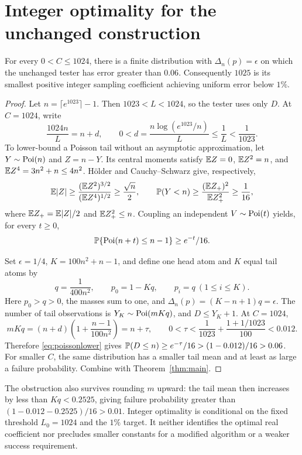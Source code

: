 \section{Integer optimality for the unchanged construction}
\begin{theorem}\label{thm:integer}
For every $0<C\le1024$, there is a finite distribution with
$\Delta_n(p)=\epsilon$ on which the unchanged tester has error greater
than $0.06$. Consequently $1025$ is its smallest positive integer sampling
coefficient achieving uniform error below $1\%$.
\end{theorem}
\begin{proof}
Let $n=\lceil e^{1023}\rceil-1$. Then $1023<L<1024$, so the tester uses
only $D$. At $C=1024$, write
\begin{equation}
 \frac{1024n}{L}=n+d,\qquad
 0<d=\frac{n\log(e^{1023}/n)}{L}\le\frac1L<\frac1{1023}.
 \label{eq:excess}
\end{equation}
To lower-bound a Poisson tail without an asymptotic approximation, let
$Y\sim\operatorname{Poi}(n)$ and $Z=n-Y$. Its central moments satisfy
$\mathbb E Z=0$, $\mathbb E Z^2=n$, and $\mathbb E Z^4=3n^2+n\le4n^2$.
H\"older and Cauchy--Schwarz give, respectively,
\[
 \mathbb E|Z|\ge\frac{(\mathbb E Z^2)^{3/2}}{(\mathbb E Z^4)^{1/2}}\ge\frac{\sqrt n}{2},
 \qquad
 \mathbb P(Y<n)\ge\frac{(\mathbb E Z_+)^2}{\mathbb E Z_+^2}\ge\frac1{16},
\]
where $\mathbb E Z_+=\mathbb E|Z|/2$ and $\mathbb E Z_+^2\le n$. Coupling an independent
$V\sim\operatorname{Poi}(t)$ yields, for every $t\ge0$,
\begin{equation}
 \mathbb P\{\operatorname{Poi}(n+t)\le n-1\}\ge e^{-t}/16.
 \label{eq:poissonlower}
\end{equation}

Set $\epsilon=1/4$, $K=100n^2+n-1$, and define one head atom and $K$
equal tail atoms by
\[
 q=\frac1{400n^2},\qquad p_0=1-Kq,\qquad p_i=q\ (1\le i\le K).
\]
Here $p_0>q>0$, the masses sum to one, and
$\Delta_n(p)=(K-n+1)q=\epsilon$. The number of tail observations is
$Y_K\sim\operatorname{Poi}(mKq)$, and $D\le Y_K+1$. At $C=1024$,
\[
 mKq=(n+d)\left(1+\frac{n-1}{100n^2}\right)=n+\tau,\qquad
 0<\tau<\frac1{1023}+\frac{1+1/1023}{100}<0.012.
\]
Therefore \eqref{eq:poissonlower} gives
$\mathbb P(D\le n)\ge e^{-\tau}/16>(1-0.012)/16>0.06$.
For smaller $C$, the same distribution has a smaller tail mean and at
least as large a failure probability. Combine with Theorem~\ref{thm:main}.
\end{proof}

The obstruction also survives rounding $m$ upward: the tail mean then
increases by less than $Kq<0.2525$, giving failure probability greater
than $(1-0.012-0.2525)/16>0.01$. Integer optimality is conditional on the
fixed threshold $L_0=1024$ and the $1\%$ target. It neither identifies the
optimal real coefficient nor precludes smaller constants for a modified
algorithm or a weaker success requirement.

